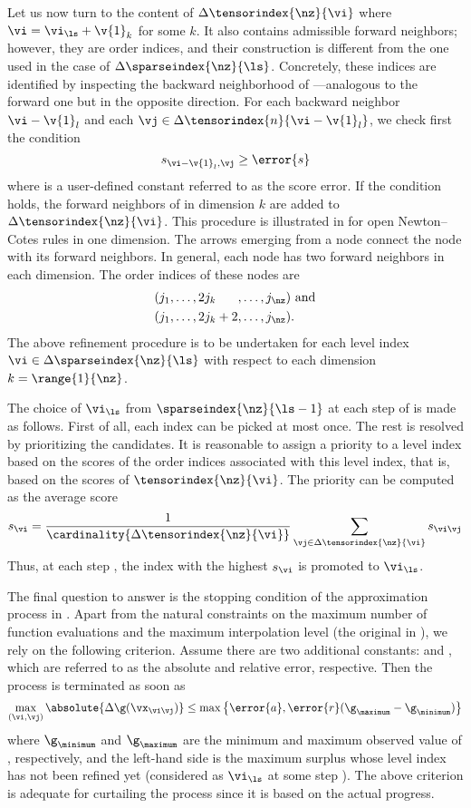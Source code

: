 Let us now turn to the content of $\Delta\tensorindex{\nz}{\vi}$ where $\vi =
\vi_{\ls} + \v{1}_k$ for some $k$. It also contains admissible forward
neighbors; however, they are order indices, and their construction is different
from the one used in the case of $\Delta\sparseindex{\nz}{\ls}$. Concretely,
these indices are identified by inspecting the backward neighborhood of
\vi---analogous to the forward one but in the opposite direction. For each
backward neighbor $\vi - \v{1}_l$ and each $\vj \in \Delta\tensorindex{n}{\vi -
\v{1}_l}$, we check first the condition
\[
  s_{\vi - \v{1}_l, \vj} \geq \error{s}
\]
where  is a user-defined constant referred to as the score error. If
the condition holds, the forward neighbors of \vj in dimension $k$ are added to
$\Delta\tensorindex{\nz}{\vi}$. This procedure is illustrated in
 for open Newton--Cotes rules in one dimension. The
arrows emerging from a node connect the node with its forward neighbors. In
general, each node has two forward neighbors in each dimension. The order
indices of these nodes are
\begin{align*}
  & (j_1, \dots, 2 j_k \phantom{{} + 2}, \dots, j_{\nz}) \text{ and} \\
  & (j_1, \dots, 2 j_k + 2,              \dots, j_{\nz}).
\end{align*}
The above refinement procedure is to be undertaken for each level index $\vi \in
\Delta\sparseindex{\nz}{\ls}$ with respect to each dimension $k =
\range{1}{\nz}$.

The choice of $\vi_{\ls}$ from $\sparseindex{\nz}{\ls - 1}$ at each step \ls of
 is made as follows. First of all, each index can be
picked at most once. The rest is resolved by prioritizing the candidates. It is
reasonable to assign a priority to a level index \vi based on the scores of the
order indices associated with this level index, that is, based on the scores of
$\tensorindex{\nz}{\vi}$. The priority can be computed as the average score
\[
  s_{\vi} = \frac{1}{\cardinality{\Delta\tensorindex{\nz}{\vi}}} \sum_{\vj \in \Delta\tensorindex{\nz}{\vi}} s_{\vi \vj}
\]
Thus, at each step \ls, the index \vi with the highest $s_{\vi}$ is promoted to
$\vi_{\ls}$.

The final question to answer is the stopping condition of the approximation
process in . Apart from the natural constraints on the
maximum number of function evaluations and the maximum interpolation level (the
original \ls in ), we rely on the following
criterion. Assume there are two additional constants:  and ,
which are referred to as the absolute and relative error, respective. Then the
process is terminated as soon as
\[
  \max_{(\vi, \vj)} \absolute{\Delta\g(\vx_{\vi \vj})} \leq \max \left\{ \error{a}, \error{r} (\g_\maximum - \g_\minimum) \right\}
\]
where $\g_\minimum$ and $\g_\maximum$ are the minimum and maximum observed value
of \g, respectively, and the left-hand side is the maximum surplus whose level
index has not been refined yet (considered as $\vi_{\ls}$ at some step \ls). The
above criterion is adequate for curtailing the process since it is based on the
actual progress.

